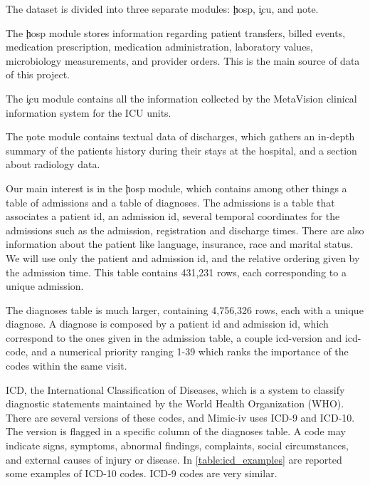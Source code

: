 \documentclass[]{marticle}
\begin{document}
The dataset is divided into three separate modules: \c{hosp}, \c{icu}, and \c{note}.

The \c{hosp} module stores information regarding patient transfers, billed events, medication
prescription, medication administration, laboratory values, microbiology measurements, and provider
orders. This is the main source of data of this project.

The \c{icu} module contains all the information collected by the MetaVision clinical information
system for the ICU units.

The \c{note} module contains textual data of discharges, which gathers an in-depth summary of the
patients history during their stays at the hospital, and a section about radiology data.

Our main interest is in the \c{hosp} module, which contains among other things a table of admissions
and a table of diagnoses. The admissions is a table that associates a patient id, an admission id,
several temporal coordinates for the admissions such as the admission, registration and discharge
times. There are also information about the patient like language, insurance, race and marital
status. We will use only the patient and admission id, and the relative ordering given by the
admission time. This table contains 431,231 rows, each corresponding to a unique admission. 

The diagnoses table is much larger, containing 4,756,326 rows, each with a unique diagnose. A
diagnose is composed by a patient id and admission id, which correspond to the ones given in the
admission table, a couple icd-version and icd-code, and a numerical priority ranging 1-39 which
ranks the importance of the codes within the same visit.

ICD, the International Classification of Diseases, which is a system to classify diagnostic
statements maintained by the World Health Organization (WHO). There are several versions of these
codes, and Mimic-iv uses ICD-9 and ICD-10. The version is flagged in a specific column of the
diagnoses table. A code may indicate signs, symptoms, abnormal findings, complaints, social
circumstances, and external causes of injury or disease. In \ref{table:icd_examples} are reported some examples
of ICD-10 codes. ICD-9 codes are very similar.
\end{document}
